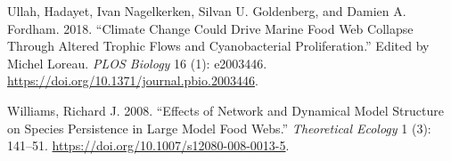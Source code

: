 \documentclass{article}
\newlength{\cslhangindent}
\newlength{\cslentryspacingunit} %
\newenvironment{CSLReferences}[2] %
 {%
  \setlength{\parindent}{0pt}
  \ifodd #1
  \let\oldpar\par
  \def\par{\hangindent=\cslhangindent\oldpar}
  \fi
  \setlength{\parskip}{#2\cslentryspacingunit}
 }%
 {}
\begin{document}
\begin{CSLReferences}{1}{0}
\leavevmode{}%
Ullah, Hadayet, Ivan Nagelkerken, Silvan U. Goldenberg, and Damien A.
Fordham. 2018. {``Climate Change Could Drive Marine Food Web Collapse
Through Altered Trophic Flows and Cyanobacterial Proliferation.''}
Edited by Michel Loreau. \emph{PLOS Biology} 16 (1): e2003446.
\url{https://doi.org/10.1371/journal.pbio.2003446}.

\leavevmode{}%
Williams, Richard J. 2008. {``Effects of Network and Dynamical Model
Structure on Species Persistence in Large Model Food Webs.''}
\emph{Theoretical Ecology} 1 (3): 141--51.
\url{https://doi.org/10.1007/s12080-008-0013-5}.

\end{CSLReferences}



\end{document}
